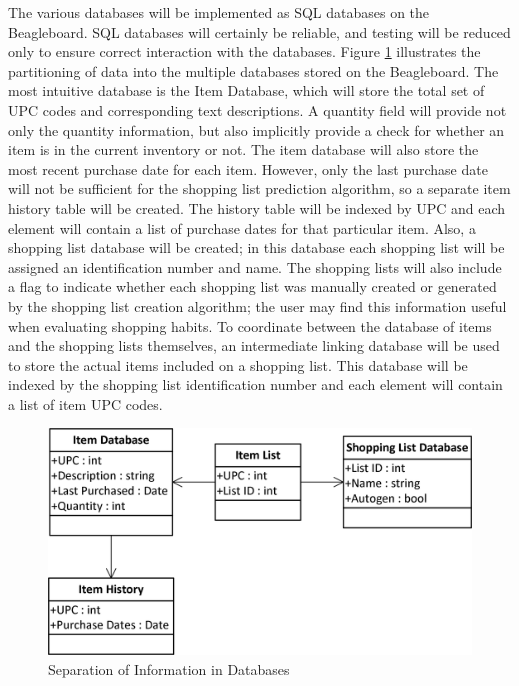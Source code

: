 \documentclass[11pt]{article} %
\begin{document}
\newline \quad \newline
The various databases will be implemented as SQL databases on the Beagleboard. SQL databases will certainly be reliable, and testing will be reduced only to ensure correct interaction with the databases. Figure \ref{fig:databases} illustrates the partitioning of data into the multiple databases stored on the Beagleboard. The most intuitive database is the Item Database, which will store the total set of UPC codes and corresponding text descriptions. A quantity field will provide not only the quantity information, but also implicitly provide a check for whether an item is in the current inventory or not. The item database will also store the most recent purchase date for each item. However, only the last purchase date will not be sufficient for the shopping list prediction algorithm, so a separate item history table will be created. The history table will be indexed by UPC and each element will contain a list of purchase dates for that particular item. Also, a shopping list database will be created; in this database each shopping list will be assigned an identification number and name. The shopping lists will also include a flag to indicate whether each shopping list was manually created or generated by the shopping list creation algorithm; the user may find this information useful when evaluating shopping habits. To coordinate between the database of items and the shopping lists themselves, an intermediate linking database will be used to store the actual items included on a shopping list. This database will be indexed by the shopping list identification number and each element will contain a list of item UPC codes.
\begin{figure}[h!]
\begin{center}
\includegraphics[scale=1.0]{../Graphics/Databases}
\caption{Separation of Information in Databases}
\label{fig:databases}
\end{center}
\end{figure}
\end{document}
